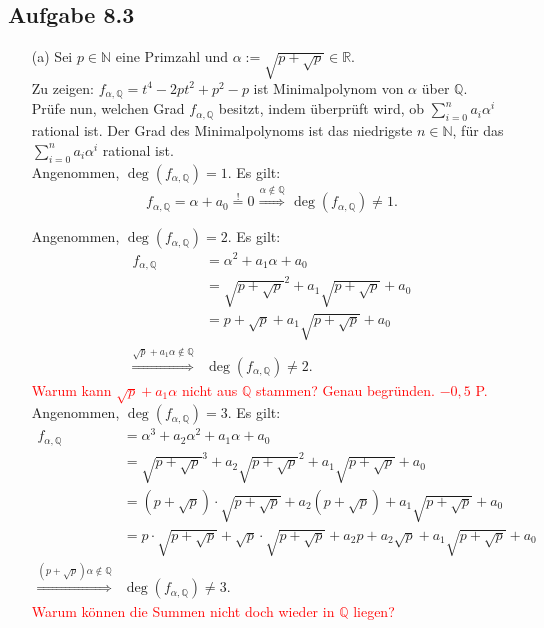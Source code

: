 \documentclass[12pt]{article}
\newcommand{\corr}[1]{\textcolor{red}{#1}}
\newcommand{\df}{\enspace\Longrightarrow\enspace}
\newcommand{\grad}{\operatorname{deg}}
\begin{document}
\subsection*{Aufgabe 8.3}
\begin{enumerate}
	\item[(a)] Sei $p\in\mathbb{N}$ eine Primzahl und $\alpha:=\sqrt{p+\sqrt{p}}\in\mathbb{R}$. \\
	Zu zeigen: $f_{\alpha,\mathbb{Q}}=t^4-2pt^2+p^2-p$ ist Minimalpolynom von $\alpha$ über $\mathbb{Q}$. \\
	Prüfe nun, welchen Grad $f_{\alpha,\mathbb{Q}}$ besitzt, indem überprüft wird, ob $\sum_{i=0}^na_i\alpha^i$ rational ist. Der Grad des Minimalpolynoms ist das niedrigste $n\in\mathbb{N}$, für das $\sum_{i=0}^na_i\alpha^i$ rational ist.\\
	
	Angenommen, $\grad(f_{\alpha,\mathbb{Q}})=1$. Es gilt:
	$$f_{\alpha,\mathbb{Q}}=\alpha+a_0\overset{!}{=}0\overset{\alpha\notin\mathbb{Q}}{\df}\grad(f_{\alpha,\mathbb{Q}})\neq1.$$
	
	Angenommen, $\grad(f_{\alpha,\mathbb{Q}})=2$. Es gilt:
	\begin{align*}
		f_{\alpha,\mathbb{Q}}&=\alpha^2+a_1\alpha+a_0 \\
		&=\sqrt{p+\sqrt{p}}^2+a_1\sqrt{p+\sqrt{p}}+a_0 \\
		&=p+\sqrt{p}+a_1\sqrt{p+\sqrt{p}}+a_0 \\
		\overset{\sqrt{p}+a_1\alpha\notin\mathbb{Q}}{\df}&\grad(f_{\alpha,\mathbb{Q}})\neq2.
	\end{align*}
\corr{Warum kann $\sqrt{p}+a_1\alpha$ nicht aus $\mathbb{Q}$ stammen? Genau begründen. $-0,5$ P.}\\
	
	Angenommen, $\grad(f_{\alpha,\mathbb{Q}})=3$. Es gilt:
	\begin{align*}
		f_{\alpha,\mathbb{Q}}&=\alpha^3+a_2\alpha^2+a_1\alpha+a_0 \\
		&=\sqrt{p+\sqrt{p}}^3+a_2\sqrt{p+\sqrt{p}}^2+a_1\sqrt{p+\sqrt{p}}+a_0 \\
		&=(p+\sqrt{p})\cdot\sqrt{p+\sqrt{p}}+a_2(p+\sqrt{p})+a_1\sqrt{p+\sqrt{p}}+a_0 \\
		&=p\cdot\sqrt{p+\sqrt{p}}+\sqrt{p}\cdot\sqrt{p+\sqrt{p}}+a_2p+a_2\sqrt{p}+a_1\sqrt{p+\sqrt{p}}+a_0 \\
		\overset{(p+\sqrt{p})\alpha\notin\mathbb{Q}}{\df}&\grad(f_{\alpha,\mathbb{Q}})\neq3.
	\end{align*}
\corr{Warum können die Summen nicht doch wieder in $\mathbb{Q}$ liegen?}\\
	

\end{enumerate}
\end{document}

